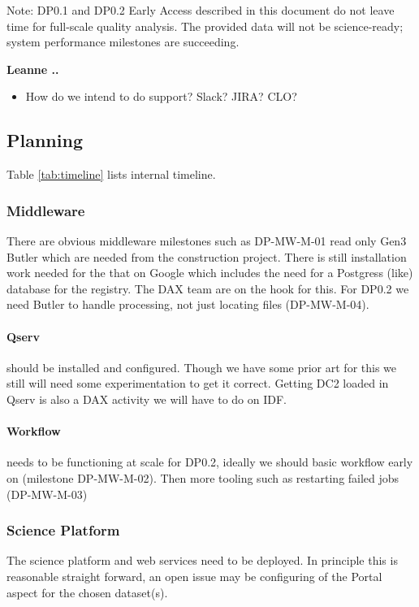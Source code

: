 Note: DP0.1 and DP0.2 Early Access described in this document do not leave time for full-scale quality analysis. The provided data will not be science-ready; system performance milestones are succeeding.

{\bf Leanne .. }

\begin{itemize}
\item How do we intend to do support? Slack? JIRA? CLO?
\end{itemize}


\subsection{Planning}



Table \ref{tab:timeline} lists internal timeline.

\subsubsection{Middleware}
There are obvious middleware milestones such as DP-MW-M-01 read only Gen3 Butler which are needed from the construction project.
There is still installation work needed for the that on Google which includes the need for a Postgress (like) database for the registry. The DAX team are on the hook for this.
For DP0.2 we need Butler to handle processing, not just locating files (DP-MW-M-04).

\paragraph{Qserv} should be installed  and configured. Though we have some prior art for this we
still will need some experimentation to get it correct. Getting DC2 loaded in Qserv is also a DAX activity
we will have to do on IDF.

\paragraph{Workflow} needs to be functioning at scale for DP0.2, ideally we should basic workflow
early on (milestone DP-MW-M-02). Then more tooling such as restarting failed jobs (DP-MW-M-03)

\subsubsection{ Science Platform}
The science platform and web services need to be deployed. In principle this is reasonable straight forward, an open issue may be configuring of the Portal aspect for the chosen  dataset(s).

